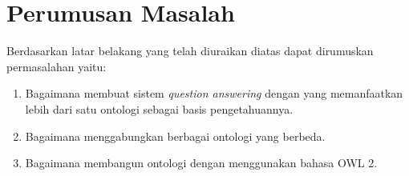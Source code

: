 \section{Perumusan Masalah}
Berdasarkan latar belakang yang telah diuraikan diatas dapat dirumuskan permasalahan yaitu:
\begin{enumerate}
	\item Bagaimana membuat sistem \textit{question answering} dengan yang memanfaatkan lebih dari satu ontologi sebagai basis pengetahuannya.
	\item Bagaimana menggabungkan berbagai ontologi yang berbeda.
	\item Bagaimana membangun ontologi dengan menggunakan bahasa OWL 2.
\end{enumerate}